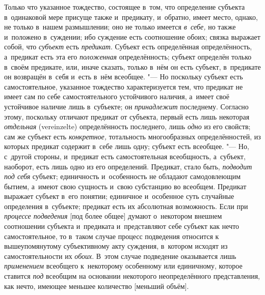 Только что указанное тождество, состоящее в~том, что определение субъекта
в~одинаковой мере присуще также и~предикату, и~обратно, имеет место, однако,
не только в~нашем размышлении; оно не только имеется {\em в~себе,} но
также и~положено в~суждении; ибо суждение есть соотношение обоих; связка
выражает собой, что {\em субъект} есть {\em предикат}.
Субъект есть определённая определённость, а~предикат есть эта его
{\em положенная} определённость; субъект определён только в~своём предикате,
или, иначе сказать, только в~нём он есть субъект, в~предикате он возвращён
в~себя и~есть в~нём всеобщее. "--- Но поскольку субъект есть
самостоятельное, указанное тождество характеризуется тем, что предикат не
имеет сам по себе самостоятельного устойчивого наличия, а~имеет своё
устойчивое наличие лишь в~субъекте; он {\em принадлежит} последнему. Согласно
этому, поскольку отличают предикат от субъекта, первый есть лишь некоторая
{\em отдельная} (verein\-zelte) определённость последнего, лишь {\em одно} из
его свойств; сам же субъект есть {\em конкретное,} тотальность многообразных
определённостей, из которых предикат содержит в~себе лишь одну; субъект есть
всеобщее. "--- Но, с~другой стороны, и~предикат есть самостоятельная
всеобщность, а~субъект, наоборот, есть лишь одно из его определений. Предикат,
стало быть, {\em подводит под себя} субъект; единичность и~особенность не
обладают самодовлеющим бытием, а~имеют свою сущность и~свою субстанцию во
всеобщем. Предикат выражает субъект в~его понятии; единичное и~особенное суть
случайные определения в~субъекте; предикат есть их абсолютная возможность.
Если при {\em процессе подведения} [под более общее] думают о~некотором внешнем
соотношении субъекта и~предиката и~представляют себе субъект как нечто
самостоятельное, то в~таком случае процесс подведения относится к
вышеупомянутому субъективному акту суждения, в~котором исходят из
самостоятельности их {\em обоих}. В~этом случае подведение оказывается лишь
{\em применением} всеобщего к~некоторому особенному или единичному, которое
ставится {\em под} всеобщим на основании некоторого неопределённого
представления, как нечто, имеющее меньшее количество [меньший объём].

